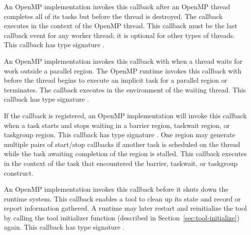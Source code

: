 \label{sec:ompt_event_thread_end}

An OpenMP implementation invokes this callback after an OpenMP thread
completes all of its tasks but before the thread is destroyed. The
callback executes in the context of the OpenMP thread. This callback
must be the last callback event for any worker thread; it is optional
for other types of threads.  This callback has type signature
.

\label{sec:ompt_event_idle}

An OpenMP implementation invokes this callback with
 when a thread waits for work
outside a parallel region.  The OpenMP runtime invokes this callback
with  before the thread begins
to execute an implicit task for a parallel region or terminates. The
callback executes in the environment of the waiting thread.  This
callback has type signature .

\label{sec:ompt_event_sync_region_wait}

If the  callback is registered,
an OpenMP implementation will invoke this callback when a task starts
and stops waiting in a barrier region, taskwait region, or taskgroup
region.  This callback has type signature
.  One region may generate
multiple pairs of start/stop callbacks if another task is scheduled on
the thread while the task awaiting completion of the region is
stalled.  This callback executes in the context of the task that
encountered the barrier, taskwait, or taskgroup construct.

\label{sec:ompt_event_runtime_shutdown}

An OpenMP implementation invokes this callback before it shuts down
the runtime system.  This callback enables a tool to clean up its
state and record or report information gathered. A runtime may later
restart and reinitialize the tool by calling the tool initializer
function (described in Section~\ref{sec:tool-initialize}) again.  This
callback has type signature .

